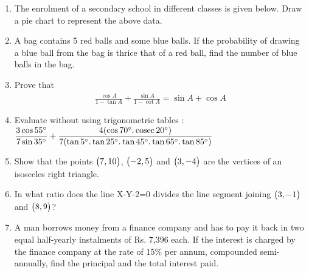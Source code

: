 \documentclass[journal,12pt,twocolumn]{IEEEtran}
\renewcommand\thesection{\arabic{section}}
\begin{document}
\begin{enumerate}[label=\thesection.\arabic*.,ref=\thesection.\theenumi]
 \item The enrolment of a secondary school in different classes is given below. Draw a pie chart to represent the above data.
 \begin{table}[htb]
 \centering
 \caption{}
 \end{table}
 \item A bag contains 5 red balls and some blue balls. If the probability of drawing a blue ball from the bag is thrice that of a red ball, find the number of blue balls in the bag.
 
 \item Prove that
 \begin{align}
 \displaystyle\frac{\cos A}{1-\tan A}+\displaystyle\frac{\sin A}{1-\cot A}=\sin A+\cos A \nonumber
 \end{align}
 
 \item Evaluate without using trigonometric tables :\\
 \bigskip
 $\displaystyle\frac{3\cos55\degree}{7\sin35\degree}+\displaystyle\frac{4(\cos70\degree.\,\text{cosec}\,20\degree)}{7(\tan5\degree.\tan25\degree.\tan45\degree.\tan65\degree.\tan85\degree)}$
 
 \item Show that the points $\begin{pmatrix}7,10\end{pmatrix} $, $\begin{pmatrix}-2,5\end{pmatrix} $ and $\begin{pmatrix}3,-4\end{pmatrix} $ are the vertices of an isosceles right triangle.
 
 \item In what ratio does the line X-Y-2=0 divides the line segment joining  $\begin{pmatrix}3,-1\end{pmatrix} $ and  $\begin{pmatrix}8,9\end{pmatrix} $? 
 
 \item A man borrows money from a finance company and has to pay it back in two equal half-yearly instalments of Rs. 7,396 each. If the interest is charged by the finance company at the rate of 15\%  per annum, compounded semi-annually, find the principal and the total interest paid.
 \end{enumerate}
\end{document}
